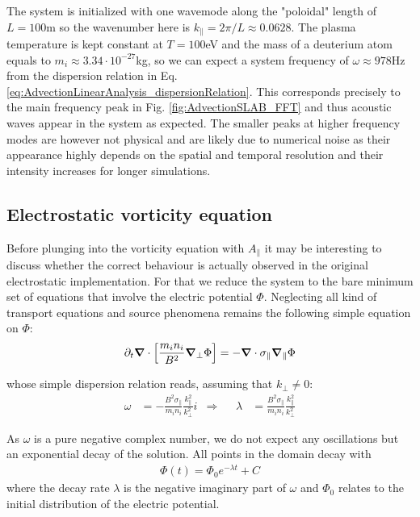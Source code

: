 The system is initialized with one wavemode along the "poloidal" length of $L=100$m so the wavenumber here is $k_\parallel = 2\pi / L \approx 0.0628$. The plasma temperature is kept constant at $T = 100$eV and the mass of a deuterium atom equals to $m_i \approx 3.34\cdot 10^{-27}$kg, so we can expect a system frequency of $\omega\approx 978$Hz from the dispersion relation in Eq. \ref{eq:AdvectionLinearAnalysis_dispersionRelation}. This corresponds precisely to the main frequency peak in Fig. \ref{fig:AdvectionSLAB_FFT} and thus acoustic waves appear in the system as expected. The smaller peaks at higher frequency modes are however not physical and are likely due to numerical noise as their appearance highly depends on the spatial and temporal resolution and their intensity increases for longer simulations. 


\subsection{Electrostatic vorticity equation}
Before plunging into the vorticity equation with $A_\parallel$ it may be interesting to discuss whether the correct behaviour is actually observed in the original electrostatic implementation. For that we reduce the system to the bare minimum set of equations that involve the electric potential $\Phi$. Neglecting all kind of transport equations and source phenomena remains the following simple equation on $\Phi$: \\
\begin{equation}
		\partial_t\grad\cdot\left[\frac{m_in_i}{B^2}\grad_\perp\Phi\right] = -\grad\cdot\sigma_\parallel\grad_\parallel\Phi \label{eq:AdvectionSLAB_PHI}
\end{equation}

whose simple dispersion relation reads, assuming that $k_\perp \ne 0$:
\begin{align}
	\omega &= -\frac{B^2\sigma_\parallel}{m_in_i}\frac{k_\parallel^2}{k_\perp^2}i &\Rightarrow&& \lambda &= \frac{B^2\sigma_\parallel}{m_in_i}\frac{k_\parallel^2}{k_\perp^2}
\label{eq:AdvectionSLAB_dispersionRelation}
\end{align}

As $\omega$ is a pure negative complex number, we do not expect any oscillations but an exponential decay of the solution. All points in the domain decay with 
\begin{align}
	\Phi(t) = \Phi_0 e^{-\lambda t} + C \label{eq:electrostaticSLABdecay}
\end{align} 
where the decay rate $\lambda$ is the negative imaginary part of $\omega$ and $\Phi_0$ relates to the initial distribution of the electric potential.

